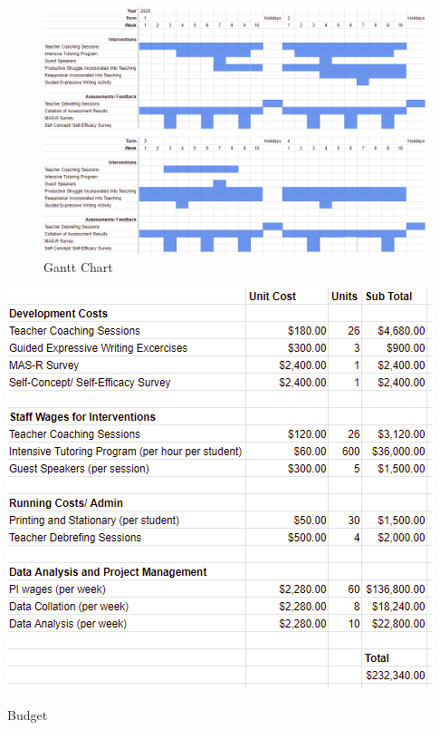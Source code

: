 \documentclass[14pt]{memoir}
\begin{document}
 \begin{figure}
 \includegraphics[scale=0.7]{Gantt_Chart.PNG}
\caption{Gantt Chart \label{fig:gantt}}
\end{figure}

\begin{table}[p]
\begin{center}
\includegraphics[scale=1.2]{Budget.PNG}
\end{center}
\caption{Budget \label{tab:budget}}
\end{table}
\end{document}
